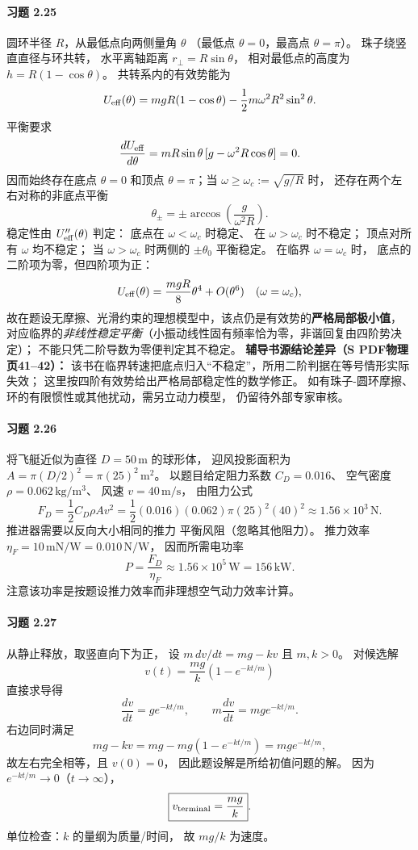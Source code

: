 \paragraph{习题 2.25}
圆环半径 \(R\)，从最低点向两侧量角 \(\theta\)
（最低点 \(\theta=0\)，最高点 \(\theta=\pi\)）。
珠子绕竖直直径与环共转，
水平离轴距离 \(r_\perp=R\sin\theta\)，
相对最低点的高度为 \(h=R(1-\cos\theta)\)。
共转系内的有效势能为
\[
 U_{\rm eff}(\theta)=mgR(1-\cos\theta)
 -\frac12m\omega^2R^2\sin^2\theta.
\]
平衡要求
\[
 \frac{dU_{\rm eff}}{d\theta}
 =mR\sin\theta\,[g-\omega^2R\cos\theta]=0.
\]
因而始终存在底点 \(\theta=0\) 和顶点
\(\theta=\pi\)；当
\(\omega\ge\omega_c:=\sqrt{g/R}\) 时，
还存在两个左右对称的非底点平衡
\[
 \boxed{\theta_\pm=\pm\arccos\left(\frac g{\omega^2R}\right)}.
\]
稳定性由 \(U_{\rm eff}''(\theta)\) 判定：
底点在 \(\omega<\omega_c\) 时稳定、
在 \(\omega>\omega_c\) 时不稳定；
顶点对所有 \(\omega\) 均不稳定；
当 \(\omega>\omega_c\) 时两侧的
\(\pm\theta_0\) 平衡稳定。
在临界 \(\omega=\omega_c\) 时，
底点的二阶项为零，但四阶项为正：
\[
 U_{\rm eff}(\theta)
 =\frac{mgR}{8}\theta^4+O(\theta^6)
 \quad(\omega=\omega_c),
\]
故在题设无摩擦、光滑约束的理想模型中，该点仍是有效势的\textbf{严格局部极小值}，
对应临界的\emph{非线性稳定平衡}（小振动线性固有频率恰为零，非谐回复由四阶势决定）；
不能只凭二阶导数为零便判定其不稳定。
\textbf{辅导书源结论差异（S PDF物理页41--42）：}
该书在临界转速把底点归入“不稳定”，所用二阶判据在等号情形实际失效；
这里按四阶有效势给出严格局部稳定性的数学修正。
如有珠子-圆环摩擦、环的有限惯性或其他扰动，需另立动力模型，
仍留待外部专家审核。

\paragraph{习题 2.26}
将飞艇近似为直径 \(D=50\,\mathrm m\) 的球形体，
迎风投影面积为
\(A=\pi(D/2)^2=\pi(25)^2\,\mathrm{m^2}\)。
以题目给定阻力系数 \(C_D=0.016\)、
空气密度 \(\rho=0.062\,\mathrm{kg/m^3}\)、
风速 \(v=40\,\mathrm{m/s}\)，
由阻力公式
\[
 F_D=\frac12C_D\rho Av^2
 =\frac12(0.016)(0.062)\pi(25)^2(40)^2
 \approx\boxed{1.56\times10^3\,\mathrm N}.
\]
推进器需要以反向大小相同的推力
平衡风阻（忽略其他阻力）。
推力效率
\(\eta_F=10\,\mathrm{mN/W}=0.010\,\mathrm{N/W}\)，
因而所需电功率
\[
 \boxed{P=\frac{F_D}{\eta_F}
 \approx1.56\times10^5\,\mathrm W
 =156\,\mathrm{kW}}.
\]
注意该功率是按题设推力效率而非理想空气动力效率计算。

\paragraph{习题 2.27}
从静止释放，取竖直向下为正，
设 \(m\,dv/dt=mg-kv\) 且 \(m,k>0\)。
对候选解
\[
 v(t)=\frac{mg}{k}(1-e^{-kt/m})
\]
直接求导得
\[
 \frac{dv}{dt}=g e^{-kt/m},\qquad
 m\frac{dv}{dt}=mg e^{-kt/m}.
\]
右边同时满足
\[
 mg-kv=mg-mg(1-e^{-kt/m})
 =mg e^{-kt/m},
\]
故左右完全相等，且 \(v(0)=0\)，
因此题设解是所给初值问题的解。
因为 \(e^{-kt/m}\to0\)（\(t\to\infty\)），
\[
 \boxed{v_{\rm terminal}=\frac{mg}{k}}.
\]
单位检查：\(k\) 的量纲为质量/时间，
故 \(mg/k\) 为速度。

